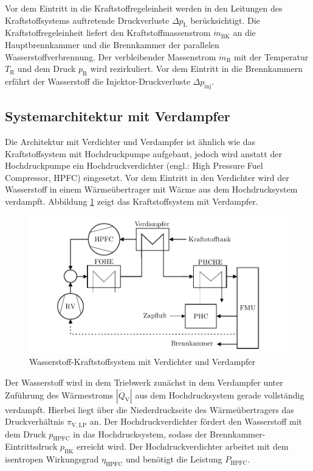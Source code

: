 Vor dem Eintritt in die Kraftstoffregeleinheit werden in den Leitungen des Kraftstoffsystems auftretende Druckverluste $\Delta p_\mathrm{L}$  berücksichtigt. Die Kraftstoffregeleinheit liefert den Kraftstoffmassenstrom $\dot{m}_{\mathrm{BK}}$ an die Hauptbrennkammer und die Brennkammer der parallelen Wasserstoffverbrennung. Der verbleibender Massenstrom $\dot{m}_\mathrm{R}$ mit der Temperatur $T_\mathrm{R}$ und dem Druck $p_\mathrm{R}$ wird rezirkuliert. Vor dem Eintritt in die Brennkammern erfährt der Wasserstoff die Injektor-Druckverluste $\Delta p_{\mathrm{inj}}$. 

\subsection{Systemarchitektur mit Verdampfer}

Die Architektur mit Verdichter und Verdampfer ist ähnlich wie das Kraftstoffsystem mit Hochdruckpumpe aufgebaut, jedoch wird anstatt der Hochdruckpumpe ein Hochdruckverdichter (engl.: High Pressure Fuel Compressor, HPFC) eingesetzt. Vor dem Eintritt in den Verdichter wird der Wasserstoff in einem Wärmeübertrager mit Wärme aus dem Hochdrucksystem verdampft. Abbildung \ref{fig:verdampfer} zeigt das Kraftstoffsystem mit Verdampfer.

\begin{figure}[ht]
\centering
\includegraphics[width=0.85\linewidth]{4_Abbildungen/2_Hauptteil/Kraftstoffsystem Abbildungen/after.pdf}
  \caption{Wasserstoff-Kraftstoffsystem mit Verdichter und Verdampfer}
  \label{fig:verdampfer}
\end{figure}
\FloatBarrier 

Der Wasserstoff wird in dem Triebwerk zunächst in dem Verdampfer unter Zuführung des Wärmestroms $|\dot{Q}_\mathrm{V}|$ aus dem Hochdrucksystem gerade vollständig verdampft. Hierbei liegt über die Niederdruckseite des Wärmeübertragers das Druckverhältnis $\pi_{\mathrm{V,LP}}$ an. Der Hochdruckverdichter fördert den Wasserstoff mit dem Druck $p_{\mathrm{HPFC}}$ in das Hochdrucksystem, sodass der Brennkammer-Eintrittsdruck $p_{\mathrm{BK}}$ erreicht wird. Der Hochdruckverdichter arbeitet mit dem isentropen Wirkungsgrad $\eta_{\mathrm{HPFC}}$ und benötigt die Leistung $P_{\mathrm{HPFC}}$. 

